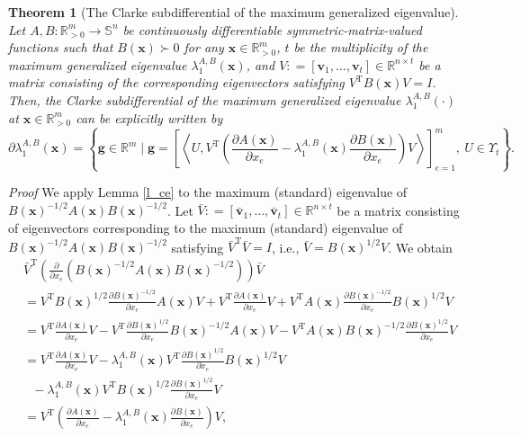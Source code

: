 \documentclass[sn-mathphys,Numbered]{sn-jnl}%
\theoremstyle{thmstyleone}%
\newtheorem{theorem}{Theorem}%
\theoremstyle{thmstyletwo}%
\theoremstyle{thmstylethree}%
\newcommand{\e}[1]{\begin{equation}#1\end{equation}}
\def\coloneq{\mathrel{\mathop:}=}
\def\rm{\mathbb{R}^m}
\def\tp{\mathrm{T}}
\def\lamx{\lambda^{A,B}_1(\boldsymbol{x})}
\def\cpartial{\partial}
\begin{document}
\begin{theorem}[The Clarke subdifferential of the maximum generalized eigenvalue]
Let $A,B:\mathbb{R}^m_{>0}\to\mathbb{S}^n$ be continuously differentiable symmetric-matrix-valued functions such that $B(\bm{x})\succ 0$ for any $\bm{x}\in\mathbb{R}^m_{>0}$, $t$ be the multiplicity of the maximum generalized eigenvalue $\lamx$, and $V\coloneq[\bm{v}_1,\ldots,\bm{v}_t]\in \mathbb{R}^{n\times t}$ be a matrix consisting of the corresponding eigenvectors satisfying $V^\tp B(\bm{x}) V=I$. Then, the Clarke subdifferential of the maximum generalized eigenvalue $\lambda^{A,B}_1(\cdot)$ at $\bm{x}\in\mathbb{R}^m_{>0}$ can be explicitly written by
\e{
\cpartial \lamx = \left\{ \bm{g}\in\rm \mid \bm{g}=\left[\left\langle U,V^\tp\left(\frac{\partial A(\bm{x})}{\partial x_e}-\lamx \frac{\partial B(\bm{x})}{\partial x_e}\right)V\right\rangle\right]_{e=1}^m,\ U\in\Upsilon_t\right\}.
\label{eq_cla}
}
\label{t_cla}
\end{theorem}
{\it Proof }
We apply Lemma \ref{l_ce} to the maximum (standard) eigenvalue of $B(\bm{x})^{-1/2}A(\bm{x})B(\bm{x})^{-1/2}$. Let $\bar{V}\coloneq[\bar{\bm{v}}_1,\ldots,\bar{\bm{v}}_t]\in \mathbb{R}^{n\times t}$ be a matrix consisting of eigenvectors corresponding to the maximum (standard) eigenvalue of $B(\bm{x})^{-1/2}A(\bm{x})B(\bm{x})^{-1/2}$ satisfying $\bar{V}^\tp \bar{V}=I$, i.e., $\bar{V}=B(\bm{x})^{1/2}V$. We obtain
\begin{align}
& \bar{V}^\tp\left(\frac{\partial}{\partial x_e}(B(\bm{x})^{-1/2}A(\bm{x})B(\bm{x})^{-1/2})\right) \bar{V}\\
&= V^\tp B(\bm{x})^{1/2}\frac{\partial B(\bm{x})^{-1/2}}{\partial x_e}A(\bm{x})V + V^\tp\frac{\partial A(\bm{x})}{\partial x_e}V + V^\tp A(\bm{x})\frac{\partial B(\bm{x})^{-1/2}}{\partial x_e}B(\bm{x})^{1/2}V\\
&= V^\tp \frac{\partial A(\bm{x})}{\partial x_e} V - V^\tp\frac{\partial B(\bm{x})^{1/2}}{\partial x_e}B(\bm{x})^{-1/2}A(\bm{x})V - V^\tp A(\bm{x})B(\bm{x})^{-1/2}\frac{\partial B(\bm{x})^{1/2}}{\partial x_e}V\\
&= V^\tp \frac{\partial A(\bm{x})}{\partial x_e} V - \lamx V^\tp\frac{\partial B(\bm{x})^{1/2}}{\partial x_e}B(\bm{x})^{1/2}V\\
&\ \ \ - \lamx V^\tp B(\bm{x})^{1/2}\frac{\partial B(\bm{x})^{1/2}}{\partial x_e}V\\
&= V^\tp\left(\frac{\partial A(\bm{x})}{\partial x_e}-\lamx \frac{\partial B(\bm{x})}{\partial x_e}\right)V,
\label{cge2}
\end{align}
\end{document}
